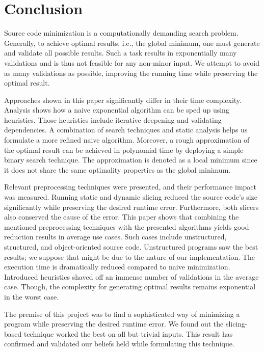 \chapter{Conclusion}


Source code minimization is a computationally demanding search problem. 
Generally, to achieve optimal results, i.e., the global minimum, one must 
generate and validate all possible results. 
Such a task results in exponentially many validations and is thus not feasible 
for any non-minor input. 
We attempt to avoid as many validations as possible, improving the running 
time while preserving the optimal result.

Approaches shown in this paper significantly differ in their time complexity. 
Analysis shows how a naive exponential algorithm can be sped up using 
heuristics. Those heuristics include iterative deepening and validating 
dependencies. 
A combination of search techniques and static analysis helps us formulate 
a more refined naive algorithm. 
Moreover, a rough approximation of the optimal result can be achieved 
in polynomial time by deploying a simple binary search technique. 
The approximation is denoted as a local minimum since it does not share 
the same optimality properties as the global minimum.

Relevant preprocessing techniques were presented, and their performance impact 
was measured. 
Running static and dynamic slicing reduced the source code's size 
significantly while preserving the desired runtime error. 
Furthermore, both slicers also conserved the cause of the error.
This paper shows that combining the mentioned preprocessing techniques with 
the presented algorithms yields good reduction results in average use cases. 
Such cases include unstructured, structured, and object-oriented source code. 
Unstructured programs saw the best results; we suppose that might be due to 
the nature of our implementation. 
The execution time is dramatically reduced compared to naive minimization. 
Introduced heuristics shaved off an immense number of validations in 
the average case. 
Though, the complexity for generating optimal results remains exponential in 
the worst case.

The premise of this project was to find a sophisticated way of minimizing 
a program while preserving the desired runtime error. 
We found out the slicing-based technique worked the best on all but trivial 
inputs. 
This result has confirmed and validated our beliefs held while formulating 
this technique.

